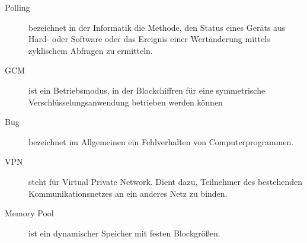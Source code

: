 \begin{description}
	\item[Polling] bezeichnet in der Informatik die Methode, den Status eines Geräts aus Hard- oder Software oder das Ereignis einer Wertänderung mittels zyklischem Abfragen zu ermitteln.
	
	\item[GCM] ist ein Betriebsmodus, in der Blockchiffren für eine symmetrische Verschlüsselungsanwendung betrieben werden können
	
	\item[Bug] bezeichnet im Allgemeinen ein Fehlverhalten von Computerprogrammen.
	
	\item[VPN] steht für Virtual Private Network. Dient dazu, Teilnehmer des bestehenden Kommunikationsnetzes an ein anderes Netz zu binden.
	
	\item[Memory Pool] ist ein dynamischer Speicher mit festen Blockgrößen.                                     
	
	  
\end{description}
